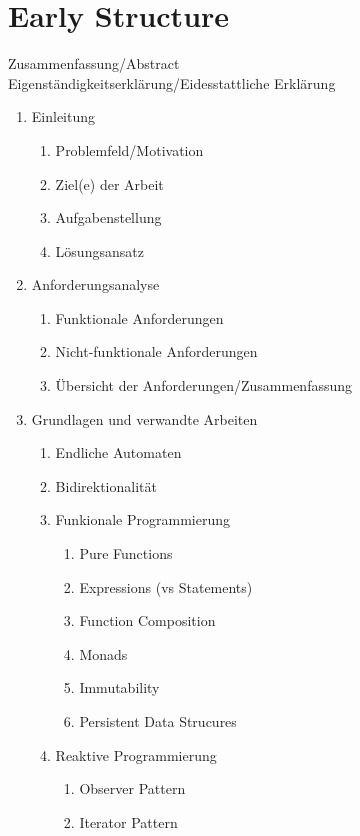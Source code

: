 \section{Early Structure}
\label{sec:early-structure}

\quad Zusammenfassung/Abstract \\
\quad Eigenständigkeitserklärung/Eidesstattliche Erklärung
\begin{enumerate}
    \item Einleitung
    \begin{enumerate}
        \item Problemfeld/Motivation
        \item Ziel(e) der Arbeit
        \item Aufgabenstellung
        \item Lösungsansatz
    \end{enumerate}
    \item Anforderungsanalyse
    \begin{enumerate}
        \item Funktionale Anforderungen
        \item Nicht-funktionale Anforderungen
        \item Übersicht der Anforderungen/Zusammenfassung
    \end{enumerate}
    \item Grundlagen und verwandte Arbeiten
    \begin{enumerate}
        \item Endliche Automaten
        \item Bidirektionalität
        \item Funkionale Programmierung
        \begin{enumerate}
            \item Pure Functions
            \item Expressions (vs Statements)
            \item Function Composition
            \item Monads
            \item Immutability
            \item Persistent Data Strucures
        \end{enumerate}
        \item Reaktive Programmierung
        \begin{enumerate}
            \item Observer Pattern
            \item Iterator Pattern

\end{enumerate}
\end{enumerate}
\end{enumerate}
